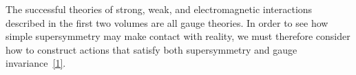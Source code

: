 
The successful theories of strong, weak, and electromagnetic interactions
described in the first two volumes are all gauge theories. In order to see
how simple supersymmetry may make contact with reality, we must therefore
consider how to construct actions that satisfy both supersymmetry and gauge
invariance~\hyperref[ch27-ref-1]{[1]}.
